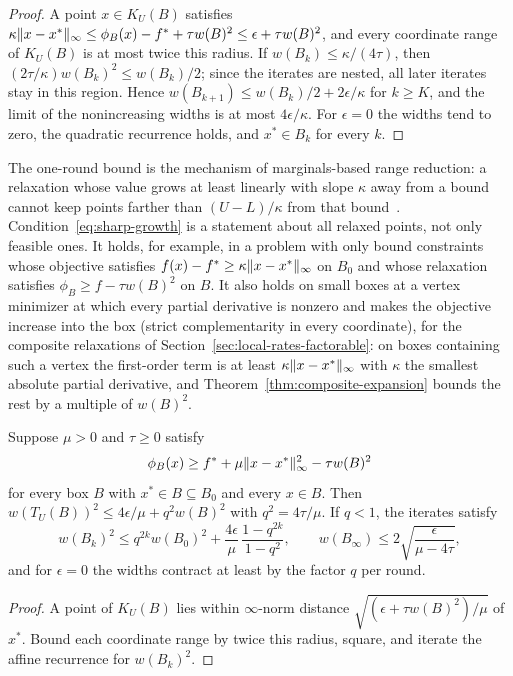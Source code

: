 \begin{proof}
A point $x\in K_U(B)$ satisfies
$\kappa\lVert x-x^*\rVert_\infty\le\phi_B(x)-f^*+\tau w(B)^2\le\epsilon+\tau w(B)^2$,
and every coordinate range of $K_U(B)$ is at most twice this radius. If
$w(B_k)\le\kappa/(4\tau)$, then $(2\tau/\kappa)w(B_k)^2\le w(B_k)/2$; since
the iterates are nested, all later iterates stay in this region. Hence
$w(B_{k+1})\le w(B_k)/2+2\epsilon/\kappa$ for $k\ge K$, and the limit of the
nonincreasing widths is at most $4\epsilon/\kappa$. For $\epsilon=0$ the
widths tend to zero, the quadratic recurrence holds, and $x^*\in B_k$ for
every $k$.
\end{proof}

The one-round bound is the mechanism of marginals-based range reduction:
a relaxation whose value grows at least linearly with slope $\kappa$ away
from a bound cannot keep points farther than $(U-L)/\kappa$ from that
bound~\cite{ryoo1995-global-optimization-of-nonconvex-nlps}. Condition~\eqref{eq:sharp-growth} is a
statement about all relaxed points, not only feasible ones. It holds, for
example, in a problem with only bound constraints whose objective satisfies
$f(x)-f^*\ge\kappa\lVert x-x^*\rVert_\infty$ on $B_0$ and whose relaxation
satisfies $\phi_B\ge f-\tau w(B)^2$ on $B$. It also holds on small boxes at a
vertex minimizer at which every partial derivative is nonzero and makes the
objective increase into the box (strict complementarity in every
coordinate), for the composite relaxations of
Section~\ref{sec:local-rates-factorable}: on boxes containing such a vertex
the first-order term is at least $\kappa\lVert x-x^*\rVert_\infty$ with $\kappa$
the smallest absolute partial derivative, and Theorem~\ref{thm:composite-expansion}
bounds the rest by a multiple of $w(B)^2$.

\begin{proposition}\label{prop:quadratic-growth}
Suppose $\mu>0$ and $\tau\ge0$ satisfy
\[
  \phi_B(x)\ge f^*+\mu\lVert x-x^*\rVert_\infty^2-\tau w(B)^2
\]
for every box $B$ with $x^*\in B\subseteq B_0$ and every $x\in B$. Then
$w(T_U(B))^2\le4\epsilon/\mu+q^2w(B)^2$ with $q^2=4\tau/\mu$. If $q<1$, the
iterates satisfy
\[
  w(B_k)^2\le q^{2k}w(B_0)^2+\frac{4\epsilon}{\mu}\,\frac{1-q^{2k}}{1-q^2},
  \qquad
  w(B_\infty)\le2\sqrt{\frac{\epsilon}{\mu-4\tau}},
\]
and for $\epsilon=0$ the widths contract at least by the factor $q$ per
round.
\end{proposition}

\begin{proof}
A point of $K_U(B)$ lies within $\infty$-norm distance
$\sqrt{(\epsilon+\tau w(B)^2)/\mu}$ of $x^*$. Bound each coordinate range by
twice this radius, square, and iterate the affine recurrence for
$w(B_k)^2$.
\end{proof}

